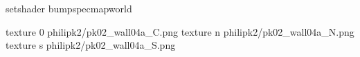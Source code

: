 setshader bumpspecmapworld

texture 0 philipk2/pk02_wall04a_C.png
texture n philipk2/pk02_wall04a_N.png
texture s philipk2/pk02_wall04a_S.png

